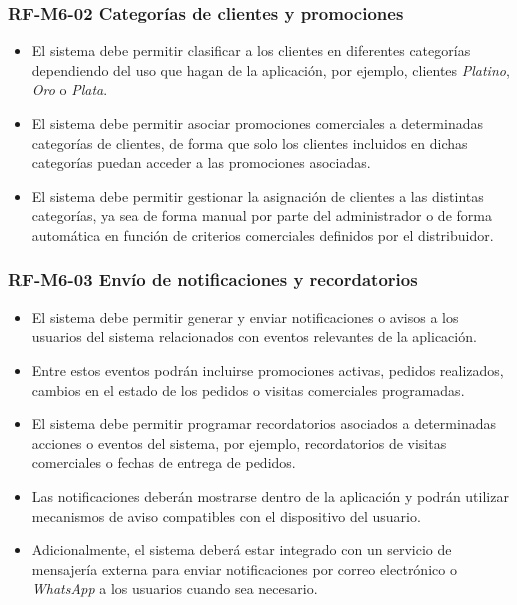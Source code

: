 \vspace{-0.75em}
\subsubsection{RF-M6-02 Categorías de clientes y promociones}
\vspace{-1em}

\begin{itemize}
    \item El sistema debe permitir clasificar a los clientes en diferentes categorías dependiendo del uso que hagan de la aplicación, por ejemplo, clientes \textit{Platino}, \textit{Oro} o \textit{Plata}.
    \item El sistema debe permitir asociar promociones comerciales a determinadas categorías de clientes, de forma que solo los clientes incluidos en dichas categorías puedan acceder a las promociones asociadas.
    \item El sistema debe permitir gestionar la asignación de clientes a las distintas categorías, ya sea de forma manual por parte del administrador o de forma automática en función de criterios comerciales definidos por el distribuidor.
\end{itemize}

\vspace{-0.75em}
\subsubsection{RF-M6-03 Envío de notificaciones y recordatorios}
\vspace{-1em}

\begin{itemize}
    \item El sistema debe permitir generar y enviar notificaciones o avisos a los usuarios del sistema relacionados con eventos relevantes de la aplicación.
    \item Entre estos eventos podrán incluirse promociones activas, pedidos realizados, cambios en el estado de los pedidos o visitas comerciales programadas.
    \item El sistema debe permitir programar recordatorios asociados a determinadas acciones o eventos del sistema, por ejemplo, recordatorios de visitas comerciales o fechas de entrega de pedidos.
    \item Las notificaciones deberán mostrarse dentro de la aplicación y podrán utilizar mecanismos de aviso compatibles con el dispositivo del usuario.
    \item Adicionalmente, el sistema deberá estar integrado con un servicio de mensajería externa para enviar notificaciones por correo electrónico o \textit{WhatsApp} a los usuarios cuando sea necesario.
\end{itemize}

